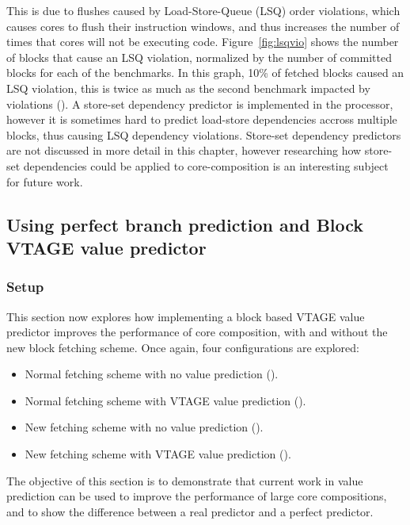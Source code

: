 This is due to flushes caused by Load-Store-Queue (LSQ) order violations, which causes cores to flush their instruction windows, and thus increases the number of times that cores will not be executing code.
Figure~\ref{fig:lsqvio} shows the number of blocks that cause an LSQ violation, normalized by the number of committed blocks for each of the benchmarks.
In this graph, 10\% of fetched blocks caused an LSQ violation, this is twice as much as the second benchmark impacted by violations ().
A store-set dependency predictor is implemented in the processor, however it is sometimes hard to predict load-store dependencies accross multiple blocks, thus causing LSQ dependency violations.
Store-set dependency predictors are not discussed in more detail in this chapter, however researching how store-set dependencies could be applied to core-composition is an interesting subject for future work.

\subsection{Using perfect branch prediction and Block VTAGE value predictor}
\subsubsection{Setup}

This section now explores how implementing a block based VTAGE value predictor improves the performance of core composition, with and without the new block fetching scheme.
Once again, four configurations are explored:
\begin{itemize}
\item Normal fetching scheme with no value prediction (\novp).
\vspace{-1em}
\item Normal fetching scheme with VTAGE value prediction (\vt).
\vspace{-1em}
\item New fetching scheme with no value prediction (\nfnovp).
\vspace{-1em}
\item New fetching scheme with VTAGE value prediction (\nfvt).
\end{itemize}
The objective of this section is to demonstrate that current work in value prediction can be used to improve the performance of large core compositions, and to show the difference between a real predictor and a perfect predictor.



